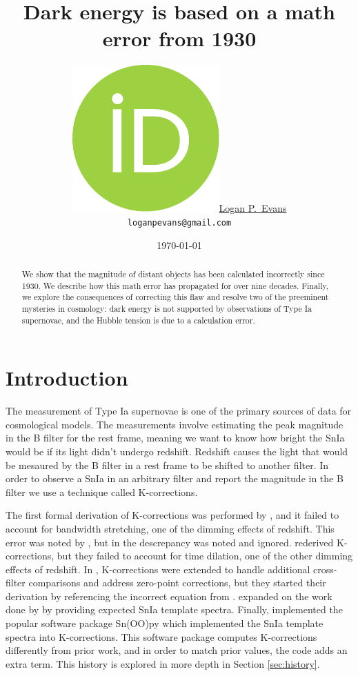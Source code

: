 \documentclass{article}
\title{Dark energy is based on a math error from 1930}
\date{\today}
\author{
  \href{https://orcid.org/0000-0001-6450-3262}{\includegraphics[scale=0.06]{orcid.pdf}\hspace{1mm}Logan P.~Evans}
  \\ \texttt{loganpevans@gmail.com}
}
\begin{document}
\maketitle

\begin{abstract}
  We show that the magnitude of distant objects has been calculated incorrectly
  since 1930. We describe how this math error has propagated for over nine
  decades. Finally, we explore the consequences of correcting this flaw and
  resolve two of the preeminent mysteries in cosmology: dark energy is not
  supported by observations of Type Ia supernovae, and the Hubble tension is
  due to a calculation error.
\end{abstract}


\section{Introduction}

The measurement of Type Ia supernovae is one of the primary sources of data for
cosmological models. The measurements involve estimating the peak magnitude in
the B filter \citet{riess1998} for the rest frame, meaning we want to know how
bright the SnIa would be if its light didn't undergo redshift. Redshift causes
the light that would be mesaured by the B filter in a rest frame to be shifted
to another filter. In order to observe a SnIa in an arbitrary filter and report
the magnitude in the B filter we use a technique called K-corrections.

The first formal derivation of K-corrections was performed by
\citet{tolman1930}, and it failed to account for bandwidth stretching, one of
the dimming effects of redshift. This error was noted by \citet{desitter1934},
but in \citet{hubble1935} the descrepancy was noted and ignored.
\citet{oke1968} rederived K-corrections, but they failed to account for time
dilation, one of the other dimming effects of redshift. In \citet{kim1996},
K-corrections were extended to handle additional cross-filter comparisons and
address zero-point corrections, but they started their derivation by
referencing the incorrect equation from \citet{oke1968}. \citet{hsiao2007}
expanded on the work done by \citet{kim1996} by providing expected SnIa
template spectra. Finally, \citet{burns2010} implemented the popular software
package Sn(OO)py which implemented the SnIa template spectra into
K-corrections. This software package computes K-corrections differently from
prior work, and in order to match prior values, the code adds an extra term.
This history is explored in more depth in Section \ref{sec:history}.
\end{document}
